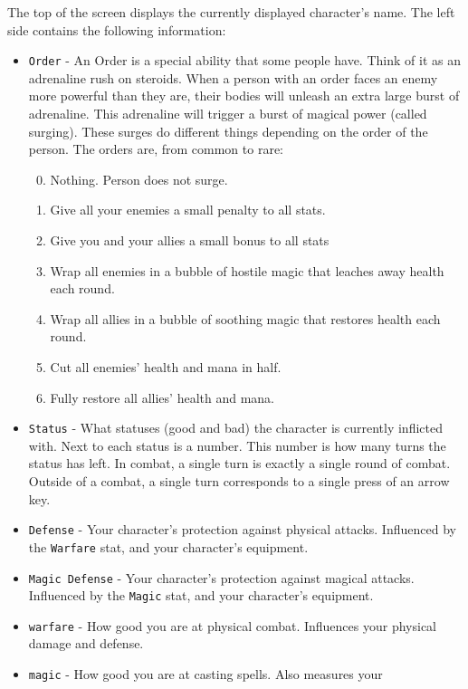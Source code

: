 \documentclass{report}
\begin{document}
The top of the screen displays the currently displayed character's name. The left 
side contains the following information:

\begin{itemize}
    \item \verb|Order| - An Order is a special ability that some people have. Think
    of it as an adrenaline rush on steroids. When a person with an order faces
    an enemy more powerful than they are, their bodies will unleash an extra large
    burst of adrenaline. This adrenaline will trigger a burst of magical power 
    (called surging). These surges do different things depending on the order of
    the person. 
    The orders are, from common to rare:
    \begin{enumerate}
        \setcounter{enumi}{-1}
        \item Nothing. Person does not surge.
        \item Give all your enemies a small penalty to all stats.
        \item Give you and your allies a small bonus to all stats
        \item Wrap all enemies in a bubble of hostile magic that leaches away health 
        each round.
        \item Wrap all allies in a bubble of soothing magic that restores health
        each round.
        \item Cut all enemies' health and mana in half.
        \item Fully restore all allies' health and mana.
    \end{enumerate}
    \item \verb|Status| - What statuses (good and bad) the character is currently 
    inflicted with. Next to each status is a number. This number is how 
    many turns the status has left. In combat, a single turn is exactly a single
    round of combat. Outside of a combat, a single turn corresponds to a single
    press of an arrow key.
    \item \verb|Defense| - Your character's protection against physical attacks. 
    Influenced by the \verb|Warfare| stat, and your character's equipment.
    \item \verb|Magic Defense| - Your character's protection against magical 
    attacks.
    Influenced by the \verb|Magic| stat, and your character's equipment.
    \item \verb|warfare| - How good you are at physical combat. Influences your
    physical damage and defense.
    \item \verb|magic| - How good you are at casting spells. Also measures your

\end{itemize}
\end{document}
